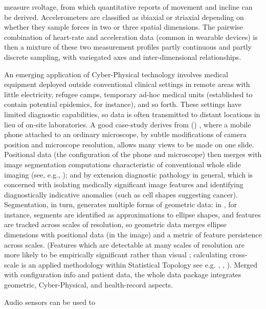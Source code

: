 {\begin{description}
measure \i{voltage}, from which quantitative reports 
of movement and incline can be derived.  Accelerometers are 
classified as \i{biaxial} or \i{triaxial} depending on 
whether they sample forces in two or three spatial 
dimensions.  
\pseudoIndent{}
The pairwise combination of heart-rate and acceleration data
(common in wearable devices) is then a mixture of these
two measurement profiles \mdash{} partly continuous and
partly discrete sampling, with variegated axes and
inter-dimensional relationships.  
\item[Remote Medical Diagnosis]  An emerging application of 
Cyber-Physical technology involves medical equipment 
deployed outside conventional clinical settings 
\mdash{} in remote areas with little electricity, refugee 
camps, temporary ad-hoc medical units (established 
to contain potential epidemics, for instance), and 
so forth.  These settings have limited diagnostic 
capabilities, so data is often transmitted to distant 
locations in lieu of on-site laboratories.  
\pseudoIndent{}
A good case-study derives from  
(\mWSI{}) \cite{Auguste}, where a mobile 
phone attached to an ordinary microscope, 
by subtle modifications of camera position and microscope 
resolution, allows many views to be made on one slide.  
Positional data (the configuration of the phone and microscope) 
then merges with image segmentation 
computations characteristic of 
conventional whole slide imaging (see, e.g., 
\cite{Farahani}); and by extension diagnostic pathology 
in general, which 
is concerned with isolating medically significant image 
features and identifying diagnostically indicative 
anomalies (such as cell shapes 
suggesting cancer). 
\pseudoIndent{}
Segmentation, in turn, 
generates multiple forms of geometric data: in 
\cite{KaleAksoy}, for instance, segments are 
identified as approximations to ellipse shapes, 
and features are tracked across scales of resolution, 
so geometric data merges ellipse dimensions with 
positional data (in the image) and a metric 
of feature persistence across scales.  
(Features which are detectable at many scales of 
resolution are more likely to be empirically 
significant rather than visual ; calculating 
cross-scale  is an applied 
methodology within Statistical Topology \mdash{} 
see e.g. \cite{EdelsbrunnerHarer}, 
\cite{HaneyMaxwell}, \cite{HarryStrange}).  
Merged with \mWSI{} configuration info and patient data, the 
whole data package integrates geometric, Cyber-Physical, 
and health-record aspects. 
\item[Speech Sampling]  Audio sensors can be used to 

\end{description}}

